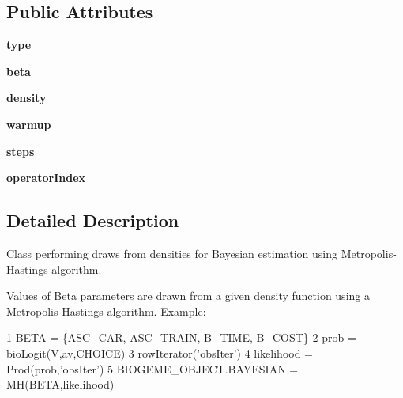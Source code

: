 \subsection*{Public Attributes}
\begin{DoxyCompactItemize}
\item 
{\bfseries type}\hypertarget{classbio__expression_1_1_m_h_a48c07484d5abd341e38f82bd8ef43b0c}{}\label{classbio__expression_1_1_m_h_a48c07484d5abd341e38f82bd8ef43b0c}

\item 
{\bfseries beta}\hypertarget{classbio__expression_1_1_m_h_a767bb48ec82475fb60d73d297f6f722d}{}\label{classbio__expression_1_1_m_h_a767bb48ec82475fb60d73d297f6f722d}

\item 
{\bfseries density}\hypertarget{classbio__expression_1_1_m_h_a5a3443d482b7fd5afa1f4b9ea1b3586a}{}\label{classbio__expression_1_1_m_h_a5a3443d482b7fd5afa1f4b9ea1b3586a}

\item 
{\bfseries warmup}\hypertarget{classbio__expression_1_1_m_h_a56901e6f39d9fc5a25b97c2f8c5f4e23}{}\label{classbio__expression_1_1_m_h_a56901e6f39d9fc5a25b97c2f8c5f4e23}

\item 
{\bfseries steps}\hypertarget{classbio__expression_1_1_m_h_a78adda7cb0d4557dbb12620ed5577621}{}\label{classbio__expression_1_1_m_h_a78adda7cb0d4557dbb12620ed5577621}

\item 
{\bfseries operator\+Index}\hypertarget{classbio__expression_1_1_m_h_af6d51b6718c53ba42e71f5071850fe06}{}\label{classbio__expression_1_1_m_h_af6d51b6718c53ba42e71f5071850fe06}

\end{DoxyCompactItemize}


\subsection{Detailed Description}
Class performing draws from densities for Bayesian estimation using Metropolis-\/\+Hastings algorithm. 

Values of \hyperlink{classbio__expression_1_1_beta}{Beta} parameters are drawn from a given density function using a Metropolis-\/\+Hastings algorithm. Example\+: 
\begin{DoxyCode}
1 BETA = \{ASC\_CAR, ASC\_TRAIN, B\_TIME, B\_COST\}
2 prob = bioLogit(V,av,CHOICE)
3 rowIterator(\textcolor{stringliteral}{'obsIter'}) 
4 likelihood = Prod(prob,\textcolor{stringliteral}{'obsIter'})
5 BIOGEME\_OBJECT.BAYESIAN = MH(BETA,likelihood)
\end{DoxyCode}
 

